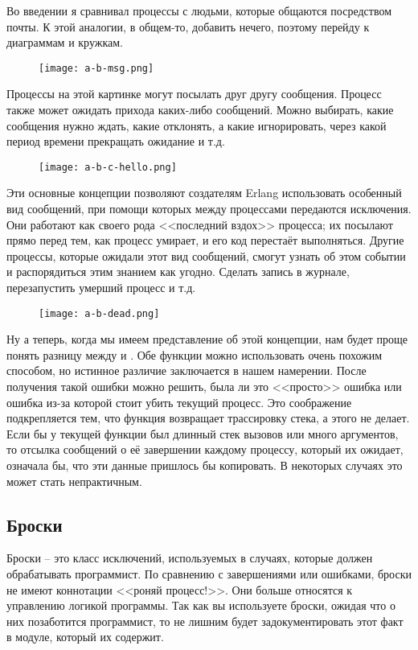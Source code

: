 Во введении я сравнивал процессы с людьми, которые общаются посредством почты. К этой аналогии, в общем\--то, добавить нечего, поэтому перейду к диаграммам и кружкам.
\begin{figure}[h!]
    \centering
    \texttt{[image: a-b-msg.png]}
\end{figure}

Процессы на этой картинке могут посылать друг другу сообщения.
Процесс также может ожидать прихода каких\--либо сообщений.
Можно выбирать, какие сообщения нужно ждать, какие отклонять, а какие игнорировать, через какой период времени прекращать ожидание и т.д.
\begin{figure}[h!]
    \centering
    \texttt{[image: a-b-c-hello.png]}
\end{figure}

Эти основные концепции позволяют создателям Erlang использовать особенный вид сообщений, при помощи которых между процессами передаются исключения.
Они работают как своего рода <<последний вздох>> процесса; их посылают прямо перед тем, как процесс умирает, и его код перестаёт выполняться.
Другие процессы, которые ожидали этот вид сообщений, смогут узнать об этом событии и распорядиться этим знанием как угодно.
Сделать запись в журнале, перезапустить умерший процесс и т.д.
\begin{figure}[h!]
    \centering
    \texttt{[image: a-b-dead.png]}
\end{figure}

Ну а теперь, когда мы имеем представление об этой концепции, нам будет проще понять разницу между  и .
Обе функции можно использовать очень похожим способом, но истинное различие заключается в нашем намерении.
После получения такой ошибки можно решить, была ли это <<просто>> ошибка или ошибка из\--за которой стоит убить текущий процесс.
Это соображение подкрепляется тем, что функция  возвращает трассировку стека, а  этого не делает.
Если бы у текущей функции был длинный стек вызовов или много аргументов, то отсылка сообщений о её завершении каждому процессу, который их ожидает, означала бы, что эти данные пришлось бы копировать. В некоторых случаях это может стать непрактичным.
\subsection{Броски}
\label{throws}
Броски \--- это класс исключений, используемых в случаях, которые должен обрабатывать программист.
По сравнению с завершениями  или ошибками, броски не имеют коннотации <<роняй процесс!>>.
Они больше относятся к управлению логикой программы.
Так как вы используете броски, ожидая что о них позаботится программист, то не лишним будет задокументировать этот факт в модуле, который их содержит.

